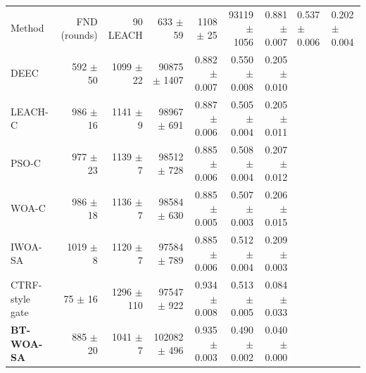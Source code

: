 \begin{tabular}{lrrrrrr}
\toprule
Method & FND (rounds) & 90 %
\midrule
LEACH & 633 $\pm$ 59 & 1108 $\pm$ 25 & 93119 $\pm$ 1056 & 0.881 $\pm$ 0.007 & 0.537 $\pm$ 0.006 & 0.202 $\pm$ 0.004 \\
DEEC & 592 $\pm$ 50 & 1099 $\pm$ 22 & 90875 $\pm$ 1407 & 0.882 $\pm$ 0.007 & 0.550 $\pm$ 0.008 & 0.205 $\pm$ 0.010 \\
LEACH-C & 986 $\pm$ 16 & 1141 $\pm$ 9 & 98967 $\pm$ 691 & 0.887 $\pm$ 0.006 & 0.505 $\pm$ 0.004 & 0.205 $\pm$ 0.011 \\
PSO-C & 977 $\pm$ 23 & 1139 $\pm$ 7 & 98512 $\pm$ 728 & 0.885 $\pm$ 0.006 & 0.508 $\pm$ 0.004 & 0.207 $\pm$ 0.012 \\
WOA-C & 986 $\pm$ 18 & 1136 $\pm$ 7 & 98584 $\pm$ 630 & 0.885 $\pm$ 0.005 & 0.507 $\pm$ 0.003 & 0.206 $\pm$ 0.015 \\
IWOA-SA & 1019 $\pm$ 8 & 1120 $\pm$ 7 & 97584 $\pm$ 789 & 0.885 $\pm$ 0.006 & 0.512 $\pm$ 0.004 & 0.209 $\pm$ 0.003 \\
CTRF-style gate & 75 $\pm$ 16 & 1296 $\pm$ 110 & 97547 $\pm$ 922 & 0.934 $\pm$ 0.008 & 0.513 $\pm$ 0.005 & 0.084 $\pm$ 0.033 \\
\textbf{BT-WOA-SA} & 885 $\pm$ 20 & 1041 $\pm$ 7 & 102082 $\pm$ 496 & 0.935 $\pm$ 0.003 & 0.490 $\pm$ 0.002 & 0.040 $\pm$ 0.000 \\
\bottomrule
\end{tabular}